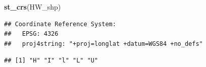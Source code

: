 \documentclass[12pt,]{article}
\newenvironment{Shaded}{\begin{snugshade}}{\end{snugshade}}
\newcommand{\KeywordTok}[1]{\textcolor[rgb]{0.13,0.29,0.53}{\textbf{#1}}}
\newcommand{\StringTok}[1]{\textcolor[rgb]{0.31,0.60,0.02}{#1}}
\newcommand{\CommentTok}[1]{\textcolor[rgb]{0.56,0.35,0.01}{\textit{#1}}}
\newcommand{\OperatorTok}[1]{\textcolor[rgb]{0.81,0.36,0.00}{\textbf{#1}}}
\newcommand{\NormalTok}[1]{#1}
\begin{document}
\begin{Shaded}
\begin{Highlighting}[]
\KeywordTok{st_crs}\NormalTok{(HW_shp)}
\end{Highlighting}
\end{Shaded}

\begin{verbatim}
## Coordinate Reference System:
##   EPSG: 4326 
##   proj4string: "+proj=longlat +datum=WGS84 +no_defs"
\end{verbatim}

\begin{Shaded}
\end{Shaded}

\begin{verbatim}
## [1] "H" "I" "l" "L" "U"
\end{verbatim}
\end{document}
